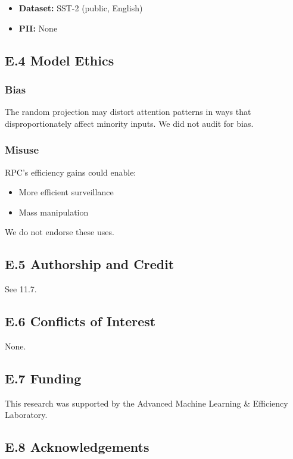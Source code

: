 \begin{itemize}
\item \textbf{Dataset:} SST-2 (public, English)
\item \textbf{PII:} None

\end{itemize}
\subsection{E.4 Model Ethics}

\subsubsection{Bias}

The random projection may distort attention patterns in ways that 
disproportionately affect minority inputs. We did not audit for bias.

\subsubsection{Misuse}

RPC's efficiency gains could enable:

\begin{itemize}
\item More efficient surveillance
\item Mass manipulation

\end{itemize}
We do not endorse these uses.

\subsection{E.5 Authorship and Credit}

See  11.7.

\subsection{E.6 Conflicts of Interest}

None.

\subsection{E.7 Funding}

This research was supported by the Advanced Machine Learning \& Efficiency Laboratory.

\subsection{E.8 Acknowledgements}

